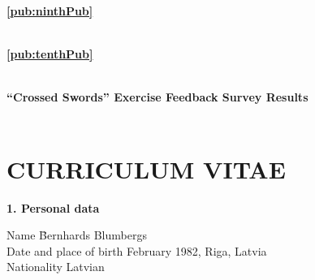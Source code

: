\vspace{6cm}
{\large
\textbf{\ref{pub:ninthPub}} \\
}
\noindent
{\large
\bibentry{\NinthArticle}
}
\newpage
\thispagestyle{empty}
$ \quad $


\vspace{6cm}
{\large
\textbf{\ref{pub:tenthPub}} \\
}
\noindent
{\large
\bibentry{\TenthArticle}
}
\newpage
\thispagestyle{empty}
$ \quad $


\label{app:survey}
\vspace{6cm}
{\large
\textbf{``Crossed Swords'' Exercise Feedback Survey Results} \\
}
\noindent
\newpage
\thispagestyle{empty}
$ \quad $





\FloatBarrier
\section*{CURRICULUM VITAE}

\setlength{\parindent}{0cm} %

\textbf{1. Personal data}

\begin{tabbing}
Name 	\quad\quad\quad\quad\quad\quad\quad\quad\quad 	\=Bernhards Blumbergs \\
Date and place of birth  February 1982, Riga, Latvia\\
Nationality \> Latvian
\end{tabbing}

